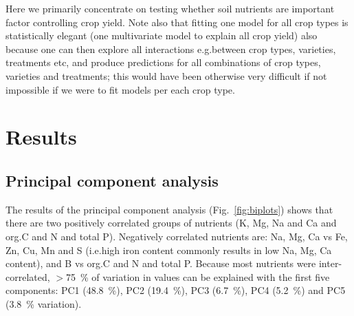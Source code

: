 \begin{linenumbers}
Here we primarily concentrate on testing whether soil nutrients are important factor controlling crop yield. Note also that fitting one model for all crop types is statistically elegant (one multivariate model to explain all crop yield) also because one can then explore all interactions e.g.\@ between crop types, varieties, treatments etc, and produce predictions for all combinations of crop types, varieties and treatments; this would have been otherwise very difficult if not impossible if we were to fit models per each crop type.\par

\section{Results}

\subsection{Principal component analysis}
%
%
%

The results of the principal component analysis (Fig.\@~\ref{fig:biplots}) shows that there are two positively correlated groups of nutrients (K, Mg, Na and Ca and org.\@ C and N and total P). Negatively correlated nutrients are: Na, Mg, Ca vs Fe, Zn, Cu, Mn and S (i.e.\@ high iron content commonly results in low Na, Mg, Ca content), and B vs org.\@ C and N and total P. Because most nutrients were inter-correlated, $>$\SI{75}{\percent} of variation in values can be explained with the first five components: PC1 (\SI{48.8}{\percent}), PC2 (\SI{19.4}{\percent}), PC3 (\SI{6.7}{\percent}), PC4 (\SI{5.2}{\percent}) and PC5 (\SI{3.8}{\percent} variation). \par


\end{linenumbers}
